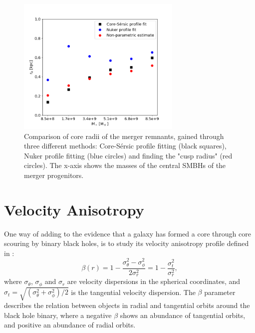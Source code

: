\documentclass[english, oneside]{HYgradu}
\begin{document}
\begin{figure}[h]
	\centering
	\includegraphics[width=0.7\textwidth]{rb_mass_relation.png}
	\caption{Comparison of core radii of the merger remnants, gained through three different methods: Core-Sérsic profile fitting (black squares), Nuker profile fitting (blue circles) and  finding the "cusp radius" (red circles). The x-axis shows the masses of the central SMBHs of the merger progenitors.}
	\label{figure:radii_comparison}
\end{figure}

\section{Velocity Anisotropy}


One way of adding to the evidence that a galaxy has formed a core through core scouring by binary black holes, is to study its velocity anisotropy profile defined in \cite{BinneyTremaine}:
\begin{equation}
\beta(r) = 1 - \frac{\sigma_\theta^2 - \sigma_\phi^2}{2\sigma_r^2} = 1 - \frac{\sigma_t^2}{\sigma_r^2}, \label{eq:beta}
\end{equation}
where $\sigma_\theta$, $\sigma_\phi$ and $\sigma_r$ are velocity dispersions in the spherical coordinates, and $\sigma_t = \sqrt{(\sigma_\theta^2 + \sigma_\phi^2) / 2}$ is the tangential velocity dispersion. The $\beta$ parameter describes the relation between objects in radial and tangential orbits around the black hole binary, where a negative $\beta$ shows an abundance of tangential orbits, and positive an abundance of radial orbits. 
\end{document}
